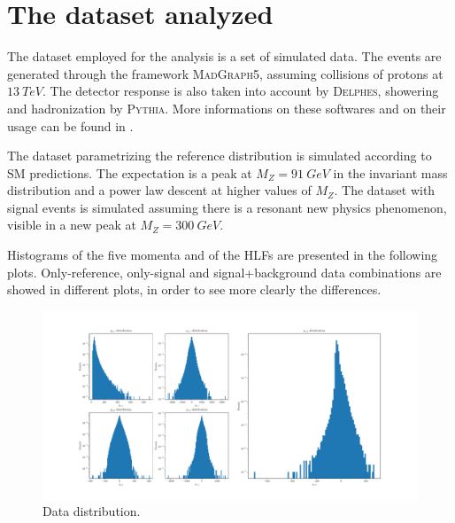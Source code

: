 \section{The dataset analyzed}
The dataset employed for the analysis is a set of simulated data. The events are generated through the framework \textsc{MadGraph5}, assuming collisions of protons at $13~\si{TeV}$. The detector response is also taken into account by \textsc{Delphes}, showering and hadronization by \textsc{Pythia}. More informations on these softwares and on their usage can be found in \cite{madgraph}.

The dataset parametrizing the reference distribution is simulated according to SM predictions. The expectation is a peak at $M_{Z} = 91~\si{GeV}$ in the invariant mass distribution and a power law descent at higher values of $M_{Z}$. The dataset with signal events is simulated assuming there is a resonant new physics phenomenon, visible in a new peak at $M_{Z} = 300~\si{GeV}$.

Histograms of the five momenta and of the HLFs are presented in the following plots. Only-reference, only-signal and signal+background data combinations are showed in different plots, in order to see more clearly the differences.

\begin{figure}[H]
	\begin{center}
		\includegraphics[width=1.0\textwidth]{Python/Z/data.pdf}
		\caption{Data distribution.}
		\label{fig:DATA_DISTRIBUTIONS}
	\end{center}
\end{figure}

